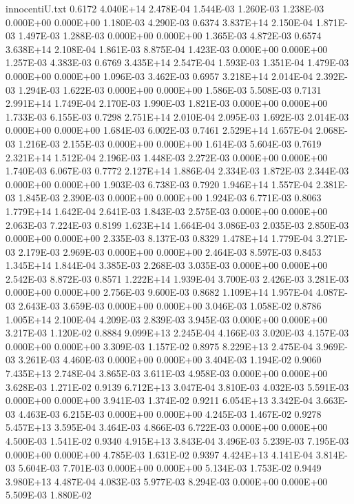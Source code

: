 \begin{filecontents}{innocentiU.txt}
0.6172 4.040E+14 2.478E-04 1.544E-03 1.260E-03 1.238E-03 0.000E+00 0.000E+00 1.180E-03 4.290E-03
0.6374 3.837E+14 2.150E-04 1.871E-03 1.497E-03 1.288E-03 0.000E+00 0.000E+00 1.365E-03 4.872E-03
0.6574 3.638E+14 2.108E-04 1.861E-03 8.875E-04 1.423E-03 0.000E+00 0.000E+00 1.257E-03 4.383E-03
0.6769 3.435E+14 2.547E-04 1.593E-03 1.351E-04 1.479E-03 0.000E+00 0.000E+00 1.096E-03 3.462E-03
0.6957 3.218E+14 2.014E-04 2.392E-03 1.294E-03 1.622E-03 0.000E+00 0.000E+00 1.586E-03 5.508E-03
0.7131 2.991E+14 1.749E-04 2.170E-03 1.990E-03 1.821E-03 0.000E+00 0.000E+00 1.733E-03 6.155E-03
0.7298 2.751E+14 2.010E-04 2.095E-03 1.692E-03 2.014E-03 0.000E+00 0.000E+00 1.684E-03 6.002E-03
0.7461 2.529E+14 1.657E-04 2.068E-03 1.216E-03 2.155E-03 0.000E+00 0.000E+00 1.614E-03 5.604E-03
0.7619 2.321E+14 1.512E-04 2.196E-03 1.448E-03 2.272E-03 0.000E+00 0.000E+00 1.740E-03 6.067E-03
0.7772 2.127E+14 1.886E-04 2.334E-03 1.872E-03 2.344E-03 0.000E+00 0.000E+00 1.903E-03 6.738E-03
0.7920 1.946E+14 1.557E-04 2.381E-03 1.845E-03 2.390E-03 0.000E+00 0.000E+00 1.924E-03 6.771E-03
0.8063 1.779E+14 1.642E-04 2.641E-03 1.843E-03 2.575E-03 0.000E+00 0.000E+00 2.063E-03 7.224E-03
0.8199 1.623E+14 1.664E-04 3.086E-03 2.035E-03 2.850E-03 0.000E+00 0.000E+00 2.335E-03 8.137E-03
0.8329 1.478E+14 1.779E-04 3.271E-03 2.179E-03 2.969E-03 0.000E+00 0.000E+00 2.464E-03 8.597E-03
0.8453 1.345E+14 1.844E-04 3.385E-03 2.268E-03 3.035E-03 0.000E+00 0.000E+00 2.542E-03 8.872E-03
0.8571 1.222E+14 1.939E-04 3.700E-03 2.426E-03 3.281E-03 0.000E+00 0.000E+00 2.756E-03 9.600E-03
0.8682 1.109E+14 1.957E-04 4.087E-03 2.643E-03 3.659E-03 0.000E+00 0.000E+00 3.046E-03 1.058E-02
0.8786 1.005E+14 2.100E-04 4.209E-03 2.839E-03 3.945E-03 0.000E+00 0.000E+00 3.217E-03 1.120E-02
0.8884 9.099E+13 2.245E-04 4.166E-03 3.020E-03 4.157E-03 0.000E+00 0.000E+00 3.309E-03 1.157E-02
0.8975 8.229E+13 2.475E-04 3.969E-03 3.261E-03 4.460E-03 0.000E+00 0.000E+00 3.404E-03 1.194E-02
0.9060 7.435E+13 2.748E-04 3.865E-03 3.611E-03 4.958E-03 0.000E+00 0.000E+00 3.628E-03 1.271E-02
0.9139 6.712E+13 3.047E-04 3.810E-03 4.032E-03 5.591E-03 0.000E+00 0.000E+00 3.941E-03 1.374E-02
0.9211 6.054E+13 3.342E-04 3.663E-03 4.463E-03 6.215E-03 0.000E+00 0.000E+00 4.245E-03 1.467E-02
0.9278 5.457E+13 3.595E-04 3.464E-03 4.866E-03 6.722E-03 0.000E+00 0.000E+00 4.500E-03 1.541E-02
0.9340 4.915E+13 3.843E-04 3.496E-03 5.239E-03 7.195E-03 0.000E+00 0.000E+00 4.785E-03 1.631E-02
0.9397 4.424E+13 4.141E-04 3.814E-03 5.604E-03 7.701E-03 0.000E+00 0.000E+00 5.134E-03 1.753E-02
0.9449 3.980E+13 4.487E-04 4.083E-03 5.977E-03 8.294E-03 0.000E+00 0.000E+00 5.509E-03 1.880E-02

\end{filecontents}
